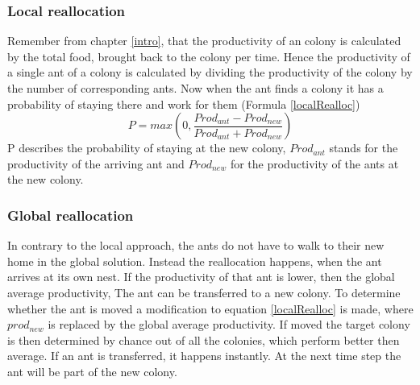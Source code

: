 \subsubsection{Local reallocation}
Remember from chapter \ref{intro}, that the productivity of an colony is calculated by the total food, brought back to the colony per time. Hence the productivity of a single ant of a colony is calculated by dividing the productivity of the colony by the number of corresponding ants. Now when the ant finds a colony it has a probability of staying there and work for them (Formula \ref{localRealloc})
\begin{equation} \label{localRealloc}
P = max(0,\frac{Prod_{ant}-Prod_{new}}{Prod_{ant}+Prod_{new}})
\end{equation}
P describes the probability of staying at the new colony, $Prod_{ant}$ stands for the productivity of the arriving ant and $Prod_{new}$ for the productivity of the ants at the new colony.
\subsubsection{Global reallocation}
In contrary to the local approach, the ants do not have to walk to their new home in the global solution. Instead the reallocation happens, when the ant arrives at its own nest. If the productivity of that ant is lower, then the global average productivity, The ant can be transferred to a new colony. To determine whether the ant is moved a modification to equation \ref{localRealloc} is made, where $prod_{new}$ is replaced by the global average productivity. If moved the target colony is then determined by chance out of all the colonies, which perform better then average.
If an ant is transferred, it happens instantly. At the next time step the ant will be part of the new colony.